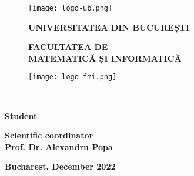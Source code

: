 \begin{titlepage}


\begin{figure}[!htb]
    \centering
    \begin{minipage}{0.2\textwidth}
        \texttt{[image: logo-ub.png]}
    \end{minipage}
    \begin{minipage}{0.5\textwidth}
        \large
        \vspace{0.2cm}
        \begin{center}
            \textbf{UNIVERSITATEA DIN BUCUREȘTI}
        \end{center}
        \vspace{0.3cm}
        \begin{center}
            \textbf{
                FACULTATEA DE \\
                MATEMATICĂ ȘI INFORMATICĂ
            }
        \end{center}
    \end{minipage}
    \begin{minipage}{0.2\textwidth}
        \texttt{[image: logo-fmi.png]}
    \end{minipage}
\end{figure}

\vspace{5cm}

\begin{center}
\huge \textbf{\@title}\\
\end{center}

\vspace{3.5cm}

\begin{center}
\large \textbf{Student \\ \@author}
\end{center}

\begin{center}
\large \textbf{Scientific coordinator \\ Prof. Dr. Alexandru Popa}
\end{center}

\vspace{2.5cm}

\begin{center}
\normalsize \textbf{Bucharest, December 2022}
\end{center}
\end{titlepage}
